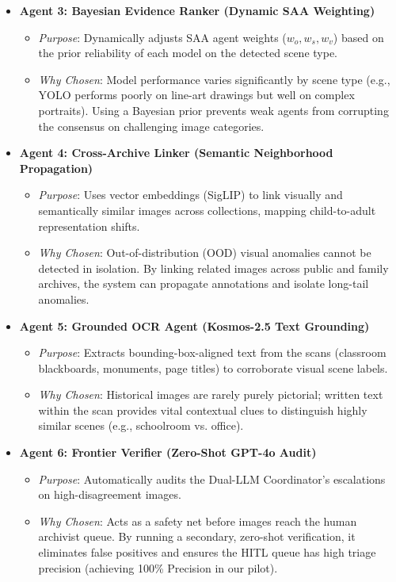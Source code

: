 \documentclass[11pt,a4paper]{article}
\begin{document}
\begin{itemize}
    \item \textbf{Agent 3: Bayesian Evidence Ranker (Dynamic SAA Weighting)}
    \begin{itemize}
        \item \textit{Purpose}: Dynamically adjusts SAA agent weights ($w_o, w_s, w_v$) based on the prior reliability of each model on the detected scene type.
        \item \textit{Why Chosen}: Model performance varies significantly by scene type (e.g., YOLO performs poorly on line-art drawings but well on complex portraits). Using a Bayesian prior prevents weak agents from corrupting the consensus on challenging image categories.
    \end{itemize}

    \item \textbf{Agent 4: Cross-Archive Linker (Semantic Neighborhood Propagation)}
    \begin{itemize}
        \item \textit{Purpose}: Uses vector embeddings (SigLIP) to link visually and semantically similar images across collections, mapping child-to-adult representation shifts.
        \item \textit{Why Chosen}: Out-of-distribution (OOD) visual anomalies cannot be detected in isolation. By linking related images across public and family archives, the system can propagate annotations and isolate long-tail anomalies.
    \end{itemize}

    \item \textbf{Agent 5: Grounded OCR Agent (Kosmos-2.5 Text Grounding)}
    \begin{itemize}
        \item \textit{Purpose}: Extracts bounding-box-aligned text from the scans (classroom blackboards, monuments, page titles) to corroborate visual scene labels.
        \item \textit{Why Chosen}: Historical images are rarely purely pictorial; written text within the scan provides vital contextual clues to distinguish highly similar scenes (e.g., schoolroom vs. office).
    \end{itemize}

    \item \textbf{Agent 6: Frontier Verifier (Zero-Shot GPT-4o Audit)}
    \begin{itemize}
        \item \textit{Purpose}: Automatically audits the Dual-LLM Coordinator's escalations on high-disagreement images.
        \item \textit{Why Chosen}: Acts as a safety net before images reach the human archivist queue. By running a secondary, zero-shot verification, it eliminates false positives and ensures the HITL queue has high triage precision (achieving 100\% Precision in our pilot).
    \end{itemize}
\end{itemize}
\end{document}
